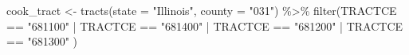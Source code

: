 \documentclass[
  krantz2]{krantz}
\makeatletter
\newenvironment{Shaded}{\begin{snugshade}}{\end{snugshade}}
\newcommand{\AttributeTok}[1]{\textcolor[rgb]{0.61,0.61,0.61}{#1}}
\newcommand{\FunctionTok}[1]{\textcolor[rgb]{0,0,0}{#1}}
\newcommand{\NormalTok}[1]{#1}
\newcommand{\OtherTok}[1]{\textcolor[rgb]{0.37,0.37,0.37}{#1}}
\newcommand{\SpecialCharTok}[1]{\textcolor[rgb]{0,0,0}{#1}}
\newcommand{\StringTok}[1]{\textcolor[rgb]{0.5,0.5,0.5}{#1}}
\newenvironment{kframe}{%
\medskip{}
\setlength{\fboxsep}{.8em}
 \def\at@end@of@kframe{}%
 \ifinner\ifhmode%
  \def\at@end@of@kframe{\end{minipage}}%
  \begin{minipage}{\columnwidth}%
 \fi\fi%
 \def\FrameCommand##1{\hskip\@totalleftmargin \hskip-\fboxsep
 \colorbox{shadecolor}{##1}\hskip-\fboxsep
     \hskip-\linewidth \hskip-\@totalleftmargin \hskip\columnwidth}%
 \MakeFramed {\advance\hsize-\width
   \@totalleftmargin\z@ \linewidth\hsize
   \@setminipage}}%
 {\par\unskip\endMakeFramed%
 \at@end@of@kframe}
\renewenvironment{Shaded}{\begin{kframe}}{\end{kframe}}
\makeatother
\begin{document}
\begin{Shaded}
\begin{Highlighting}[]
\NormalTok{cook\_tract }\OtherTok{\textless{}{-}} \FunctionTok{tracts}\NormalTok{(}\AttributeTok{state =} \StringTok{"Illinois"}\NormalTok{, }\AttributeTok{county =} \StringTok{"031"}\NormalTok{) }\SpecialCharTok{\%\textgreater{}\%} 
  \FunctionTok{filter}\NormalTok{(TRACTCE }\SpecialCharTok{==} \StringTok{"681100"} \SpecialCharTok{|}\NormalTok{ TRACTCE }\SpecialCharTok{==} \StringTok{"681400"} \SpecialCharTok{|} 
\NormalTok{           TRACTCE }\SpecialCharTok{==} \StringTok{"681200"} \SpecialCharTok{|}\NormalTok{ TRACTCE }\SpecialCharTok{==} \StringTok{"681300"}\NormalTok{ )}
\end{Highlighting}
\end{Shaded}

\begin{verbatim}

\end{verbatim}
\end{document}
